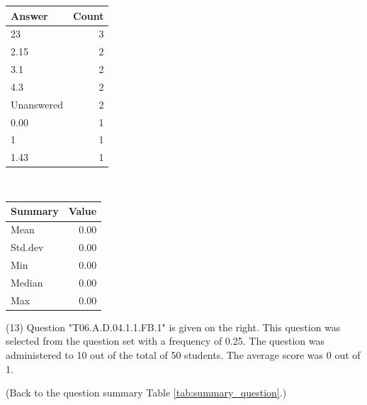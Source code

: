 \documentclass[12pt,english,nohyper]{tufte-handout}\usepackage[]{graphicx}\usepackage[]{color}
\begin{document}
\begin{center}%
\begin{tabular}{lr}
  \hline
Answer & Count \\ 
  \hline
23 &   3 \\ 
  2.15 &   2 \\ 
  3.1 &   2 \\ 
  4.3 &   2 \\ 
  Unanswered &   2 \\ 
  0.00 &   1 \\ 
  1 &   1 \\ 
  1.43 &   1 \\ 
   \hline
\end{tabular}
~~~~~~~~%
\begin{tabular}{lr}
  \hline
Summary & Value \\ 
  \hline
Mean & 0.00 \\ 
  Std.dev & 0.00 \\ 
  Min & 0.00 \\ 
  Median & 0.00 \\ 
  Max & 0.00 \\ 
   \hline
\end{tabular}
\end{center}\newpage{} (13) Question "T06.A.D.04.1.1.FB.1" is given on the right. This question was selected from the question set with a frequency of 0.25. The question was administered to 10 out of the total of 50 students. The average score was 0 out of 1.

 (Back to the question summary Table \ref{tab:summary_question}.)
\end{document}
